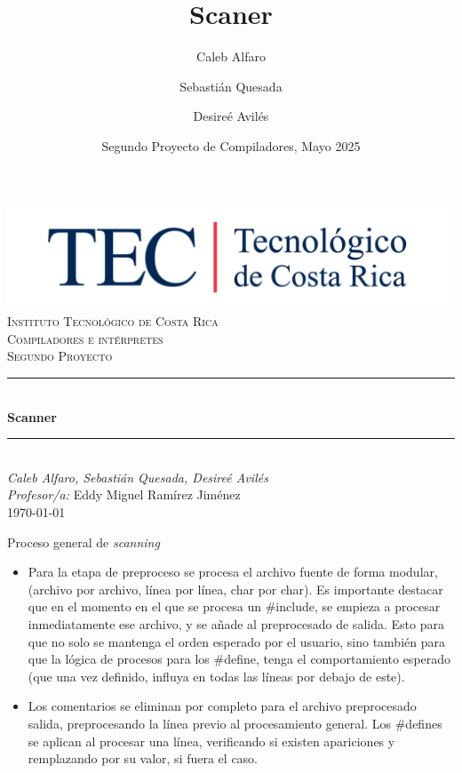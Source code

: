 \documentclass{beamer}
\title[Scaner]{Scaner}
\author[Caleb\and Sebastián \and Desireé]{Caleb Alfaro \and Sebastián Quesada \and Desireé Avilés\inst{1}}
\date[TEC 2025]{Segundo Proyecto de Compiladores, Mayo 2025}
\begin{document}
\begin{frame}
  \centering
  \vspace*{0.3cm}
  \includegraphics[scale = 0.07]{logoTEC.png}\\
  \textsc{\small Instituto Tecnológico de Costa Rica}\\[1.7em]
  \textsc{\small Compiladores e intérpretes}\\[0.3em]
  \textsc{\small Segundo Proyecto}\\[0.5em]
  \rule{\linewidth}{0.2 mm} \\[0.3 cm]
  {\LARGE \textbf{Scanner}}\\
  \rule{\linewidth}{0.2 mm} \\[0.3 cm]
  {\normalsize \emph{Caleb Alfaro, Sebastián Quesada, Desireé Avilés } }\\[1.6em]
  {\small \emph{Profesor/a:} Eddy Miguel Ramírez Jiménez}\\[0.5em]
  {\footnotesize \today}
\end{frame}

\begin{frame}{Proceso general de \textit{scanning}}
\begin{itemize}
    \item Para la etapa de preproceso se procesa el archivo fuente de forma modular, (archivo por archivo, línea por línea, char por char). Es importante destacar que en el momento en el que se procesa un  \#include, se empieza a procesar inmediatamente ese archivo, y se añade al preprocesado de salida. Esto para que no solo se mantenga el orden esperado por el usuario, sino también para que la lógica de procesos para los \#define, tenga el comportamiento esperado (que una vez definido, influya en todas las líneas por debajo de este).

    \item Los comentarios se eliminan por completo para el archivo preprocesado salida, preprocesando la línea previo al procesamiento general. Los \#defines se aplican al procesar una línea, verificando si existen apariciones y remplazando por su valor, si fuera el caso.
\end{itemize}
\end{frame}
\end{document}
